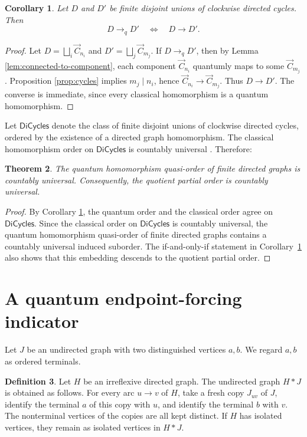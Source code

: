 \documentclass[11pt]{amsart}
\theoremstyle{plain}
\newtheorem{theorem}{Theorem}[section]
\newtheorem{corollary}[theorem]{Corollary}
\theoremstyle{definition}
\newtheorem{definition}[theorem]{Definition}
\newcommand{\toq}{\to_q}
\newcommand{\Cyc}{\overrightarrow{C}}
\newcommand{\DiCycles}{\mathsf{DiCycles}}
\begin{document}
\begin{corollary}\label{cor:dicycles-q-classical}
Let $D$ and $D'$ be finite disjoint unions of clockwise directed cycles.  Then
\[
   D\toq D'
   \quad\Longleftrightarrow\quad
   D\to D'.
\]
\end{corollary}

\begin{proof}
Let $D=\bigsqcup_i \Cyc_{n_i}$ and $D'=\bigsqcup_j\Cyc_{m_j}$.  If $D\toq D'$, then by Lemma \ref{lem:connected-to-component}, each component $\Cyc_{n_i}$ quantumly maps to some $\Cyc_{m_j}$.  Proposition \ref{prop:cycles} implies $m_j\mid n_i$, hence $\Cyc_{n_i}\to\Cyc_{m_j}$.  Thus $D\to D'$.  The converse is immediate, since every classical homomorphism is a quantum homomorphism.
\end{proof}

Let $\DiCycles$ denote the class of finite disjoint unions of clockwise directed cycles, ordered by the existence of a directed graph homomorphism.  The classical homomorphism order on $\DiCycles$ is countably universal \cite{FialaHubickaLong}.  Therefore:

\begin{theorem}\label{thm:directed-universal}
The quantum homomorphism quasi-order of finite directed graphs is countably universal.  Consequently, the quotient partial order is countably universal.
\end{theorem}

\begin{proof}
By Corollary \ref{cor:dicycles-q-classical}, the quantum order and the classical order agree on $\DiCycles$.  Since the classical order on $\DiCycles$ is countably universal, the quantum homomorphism quasi-order of finite directed graphs contains a countably universal induced suborder.  The if-and-only-if statement in Corollary~\ref{cor:dicycles-q-classical} also shows that this embedding descends to the quotient partial order.
\end{proof}

\section{A quantum endpoint-forcing indicator}

Let $J$ be an undirected graph with two distinguished vertices $a,b$.  We regard $a,b$ as ordered terminals.

\begin{definition}\label{def:replacement}
Let $H$ be an irreflexive directed graph.  The undirected graph $H*J$ is obtained as follows.  For every arc $u\to v$ of $H$, take a fresh copy $J_{uv}$ of $J$, identify the terminal $a$ of this copy with $u$, and identify the terminal $b$ with $v$.  The nonterminal vertices of the copies are all kept distinct.  If $H$ has isolated vertices, they remain as isolated vertices in $H*J$.
\end{definition}
\end{document}
